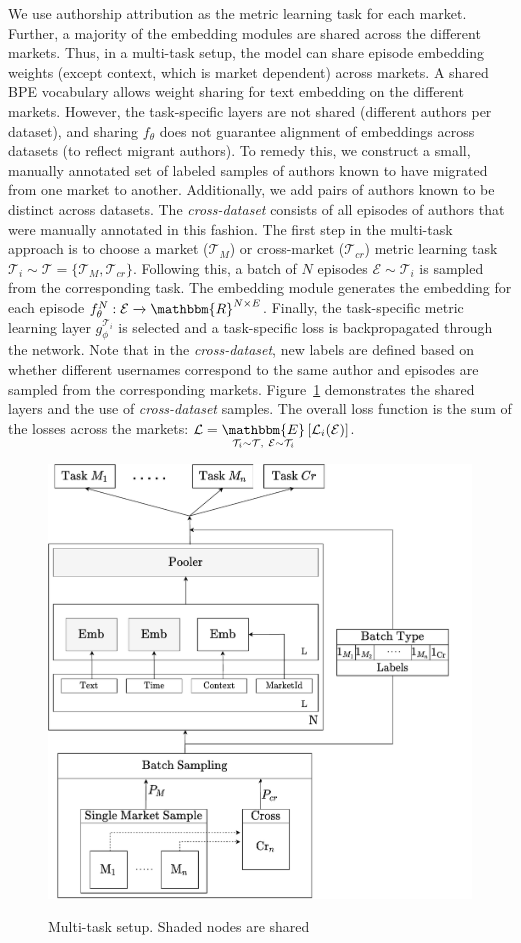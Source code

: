 We use authorship attribution as the metric learning task for each market.
Further, a majority of the embedding modules are shared across the different markets.
Thus, in a multi-task setup, the model can share episode embedding weights (except context, which is market dependent) across markets. 
A shared BPE vocabulary allows weight sharing for text embedding on the different markets. 
However, the task-specific layers are not shared (different authors per dataset), and sharing $f_\theta$ does not guarantee alignment of embeddings across datasets (to reflect migrant authors). 
To remedy this, we construct a small, manually annotated set of labeled samples of authors known to have migrated from one market to another.
Additionally, we add pairs of authors known to be distinct across datasets.
The \textit{cross-dataset} consists of all episodes of authors that were manually annotated in this fashion.
The first step in the multi-task approach is to choose a market {($\mathcal{T}_M$)} or cross-market {($\mathcal{T}_{cr}$)} metric learning task $\mathcal{T}_i \sim \mathcal{T} =  \{\mathcal{T}_M, \mathcal{T}_{cr} \}$.
Following this, a batch of $N$ episodes $\mathcal{E} \sim \mathcal{T}_i$ is sampled from the corresponding task.
The embedding module generates the embedding for each episode $f_{\theta}^N: \mathcal{E} \xrightarrow[]{} \mathbbm{R}^{N \times E}$. 
Finally, the task-specific metric learning layer $g_{\phi}^{\mathcal{T}_i}$ is selected and a task-specific loss is backpropagated through the network. 
Note that in the \textit{cross-dataset}, new labels are defined based on whether different usernames correspond to the same author and episodes are sampled from the corresponding markets. 
Figure~\ref{fig:multitask_setup} demonstrates the shared layers and the use of \textit{cross-dataset} samples. 
The overall loss function is the sum of the losses across the markets: $\mathcal{L} = \underset{\mathcal{T}_i \sim \mathcal{T},\ \mathcal{E} \sim \mathcal{T}_i}{\mathbbm{E}}\left[\mathcal{L}_i(\mathcal{E})\right] $.
\begin{figure}
    \centering
    \includegraphics[width=0.8\linewidth,alt={Block diagram for the multitask setup.}]{sysml/figures/MultiTask.pdf}
    \caption{Multi-task setup. Shaded nodes are shared}
    \label{fig:multitask_setup}
\end{figure}
